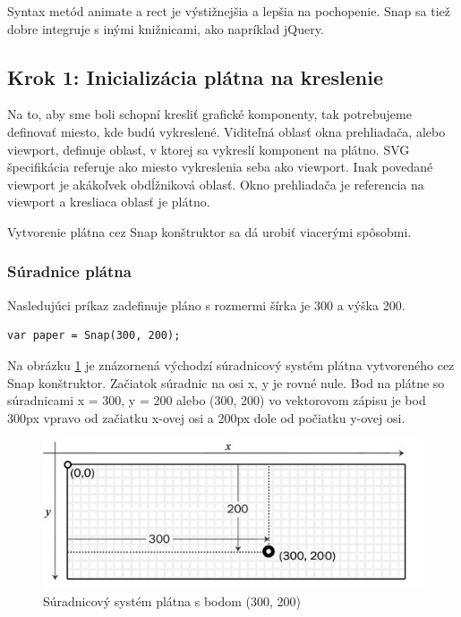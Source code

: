 Syntax metód animate a rect je výstižnejšia a lepšia na pochopenie. Snap sa tiež dobre integruje s inými knižnicami, ako napríklad jQuery. 


\newpage
%

 
\subsection{Krok 1: Inicializácia plátna na kreslenie}
Na to, aby sme boli schopní kresliť grafické komponenty, tak potrebujeme definovať miesto, kde budú vykreslené. 
Viditeľná oblasť okna prehliadača, alebo viewport, definuje oblasť, v ktorej sa vykreslí komponent na plátno.
SVG špecifikácia referuje ako miesto vykreslenia seba ako viewport. 
Inak povedané viewport je akákoľvek obdĺžniková oblasť.
Okno prehliadača je referencia na viewport a kresliaca oblasť je plátno.   \cite{Dawber}


Vytvorenie plátna cez Snap konštruktor sa dá urobiť viacerými spôsobmi.

\subsubsection{Súradnice plátna}
 
 
Nasledujúci príkaz zadefinuje pláno s rozmermi šírka je 300 a výška 200. 
\begin{lstlisting}
var paper = Snap(300, 200);
\end{lstlisting}


Na obrázku \ref{fig:suradnice1}  je znázornená východzí súradnicový systém plátna vytvoreného cez Snap konštruktor. 
Začiatok súradnic na osi x, y je rovné nule. Bod na plátne so súradnicami x = 300, y = 200 alebo (300, 200) vo vektorovom zápisu je bod 300px vpravo od začiatku x-ovej osi a 200px dole od počiatku y-ovej osi. 

\begin{center}
	\begin{figure}[hp]
\centering
\includegraphics[width=0.7\linewidth]{obrazky/suradnice1}
\caption{Súradnicový systém plátna s bodom (300, 200)}
\label{fig:suradnice1}
\end{figure}
\end{center}


